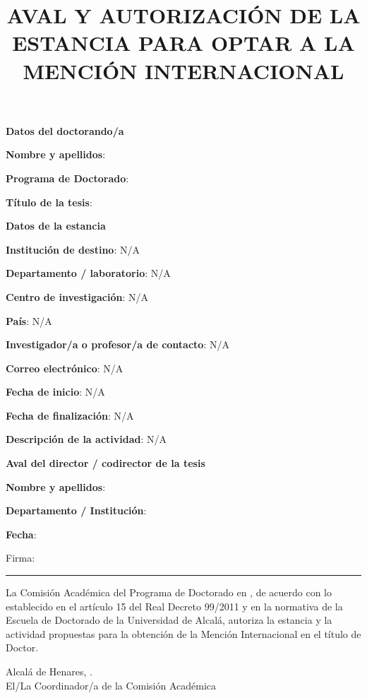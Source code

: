 \documentclass[11pt,a4paper,oneside]{article}
\title{AVAL Y AUTORIZACIÓN DE LA ESTANCIA PARA OPTAR A LA MENCIÓN INTERNACIONAL}
\date{}
\newcommand{\PhDFormSection}[1]{%
  \vspace{0.45cm}\noindent\textbf{\large #1}\par\smallskip}
\newcommand{\PhDFormField}[2]{%
  \noindent\textbf{#1}: #2\par}
\newcommand{\PhDFormBlank}[1]{\rule{#1}{0.4pt}}
\newcommand{\PhDNA}{N/A}
\providecommand{\myResearchStayInstitution}{\PhDNA}
\providecommand{\myResearchStayDepartment}{\PhDNA}
\providecommand{\myResearchStayResearchCenter}{\PhDNA}
\providecommand{\myResearchStayCountry}{\PhDNA}
\providecommand{\myResearchStaySupervisorFullName}{\PhDNA}
\providecommand{\myResearchStaySupervisorEmail}{\PhDNA}
\providecommand{\myResearchStayStartDate}{\PhDNA}
\providecommand{\myResearchStayEndDate}{\PhDNA}
\providecommand{\myResearchStayActivityDescription}{\PhDNA}
\begin{document}
\maketitle
\thispagestyle{empty}

\PhDFormSection{Datos del doctorando/a}
\PhDFormField{Nombre y apellidos}{\myAuthorFullName}
\PhDFormField{Programa de Doctorado}{\myPhDProgram}
\PhDFormField{Título de la tesis}{\myBookTitle}

\PhDFormSection{Datos de la estancia}
\PhDFormField{Institución de destino}{\myResearchStayInstitution}
\PhDFormField{Departamento / laboratorio}{\myResearchStayDepartment}
\PhDFormField{Centro de investigación}{\myResearchStayResearchCenter}
\PhDFormField{País}{\myResearchStayCountry}
\PhDFormField{Investigador/a o profesor/a de contacto}{\myResearchStaySupervisorFullName}
\PhDFormField{Correo electrónico}{\myResearchStaySupervisorEmail}
\PhDFormField{Fecha de inicio}{\myResearchStayStartDate}
\PhDFormField{Fecha de finalización}{\myResearchStayEndDate}
\PhDFormField{Descripción de la actividad}{\myResearchStayActivityDescription}

\PhDFormSection{Aval del director / codirector de la tesis}
\PhDFormField{Nombre y apellidos}{\myAcademicTutorFullName}
\PhDFormField{Departamento / Institución}{\AcademicTutorAffiliation}
\PhDFormField{Fecha}{\myPaperworkDate}
\vspace{1.5cm}
\noindent Firma: \PhDFormBlank{5cm}

\vspace{0.8cm}
La Comisión Académica del Programa de Doctorado en \myPhDProgram{}, de acuerdo con lo establecido en el artículo 15 del Real Decreto 99/2011 y en la normativa de la Escuela de Doctorado de la Universidad de Alcalá, autoriza la estancia y la actividad propuestas para la obtención de la Mención Internacional en el título de Doctor.

\vfill
\begin{flushright}
Alcalá de Henares, \myPaperworkDate.\\[1.5cm]
El/La Coordinador/a de la Comisión Académica
\end{flushright}
\end{document}
